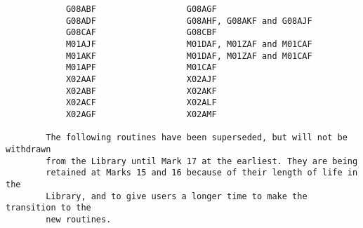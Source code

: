 \begin{small}
\begin{verbatim}
            G08ABF                  G08AGF                                       
            G08ADF                  G08AHF, G08AKF and G08AJF                    
            G08CAF                  G08CBF                                       
            M01AJF                  M01DAF, M01ZAF and M01CAF                    
            M01AKF                  M01DAF, M01ZAF and M01CAF                    
            M01APF                  M01CAF                                       
            X02AAF                  X02AJF                                       
            X02ABF                  X02AKF                                       
            X02ACF                  X02ALF                                       
            X02AGF                  X02AMF                                       
                                                                                 
        The following routines have been superseded, but will not be withdrawn   
        from the Library until Mark 17 at the earliest. They are being           
        retained at Marks 15 and 16 because of their length of life in the       
        Library, and to give users a longer time to make the transition to the   
        new routines.                                                            
                                                                                 

\end{verbatim}
\end{small}
